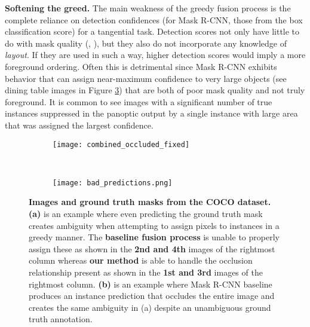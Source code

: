 \documentclass[10pt,twocolumn,letterpaper]{article}
\begin{document}
\newpage

\noindent \textbf{Softening the greed.} The main weakness of the greedy fusion process is the complete reliance on detection confidences (\eg for Mask R-CNN, those from the box classification score) for a tangential task. Detection scores not only have little to do with mask quality (\eg, \cite{huang2019mask}), but they also do not incorporate any knowledge of \textit{layout}. If they are used in such a way, higher detection scores would imply a more foreground ordering. Often this is detrimental since Mask R-CNN exhibits behavior that can assign near-maximum confidence to very large objects (\eg see dining table images in Figure \ref{fig:COCO_bad_prediction}) that are both of poor mask quality and not truly foreground. It is common to see images with a significant number of true instances suppressed in the panoptic output by a single instance with large area that was assigned the largest confidence.

\begin{figure}[!htp]
\vspace{-1mm}
\begin{center}
\begin{subfigure}{0.47\textwidth}\centering
\texttt{[image: combined\_occluded\_fixed]} 
\caption{\phantom{a}}\label{fig:COCO_occlusion}
\end{subfigure} \\
\begin{subfigure}{0.47\textwidth}
\centering
\texttt{[image: bad\_predictions.png]}
\caption{\phantom{b}}\label{fig:COCO_bad_prediction}
\end{subfigure}
\vspace{-3mm}
\caption{\textbf{Images and ground truth masks from the COCO dataset.} \textbf{(a)} is an example where even predicting the ground truth mask creates ambiguity when attempting to assign pixels to instances in a greedy manner. The \textbf{baseline fusion process} \cite{kirillov2018panoptic} is unable to properly assign these as shown in the \textbf{2nd and 4th} images of the rightmost column whereas \textbf{our method} is able to handle the occlusion relationship present as shown in the \textbf{1st and 3rd} images of the rightmost column. \textbf{(b)} is an example where Mask R-CNN baseline produces an instance prediction that occludes the entire image and creates the same ambiguity in (a) despite an unambiguous ground truth annotation.}
\end{center}
\vspace{-4mm}
\end{figure}
\end{document}
